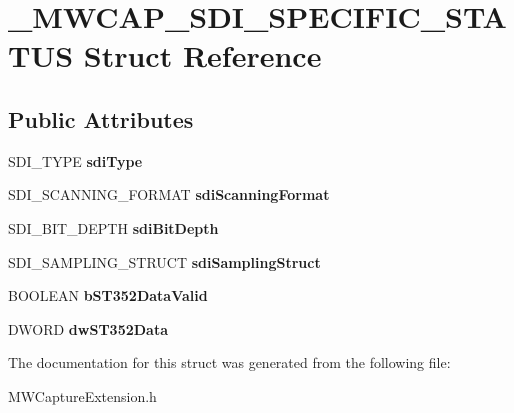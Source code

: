 \hypertarget{struct__MWCAP__SDI__SPECIFIC__STATUS}{\section{\-\_\-\-M\-W\-C\-A\-P\-\_\-\-S\-D\-I\-\_\-\-S\-P\-E\-C\-I\-F\-I\-C\-\_\-\-S\-T\-A\-T\-U\-S Struct Reference}
\label{struct__MWCAP__SDI__SPECIFIC__STATUS}
}
\subsection*{Public Attributes}
\begin{DoxyCompactItemize}
\item 
\hypertarget{struct__MWCAP__SDI__SPECIFIC__STATUS_a866c7aa6588af98e8a3ddc540ca386ba}{S\-D\-I\-\_\-\-T\-Y\-P\-E {\bfseries sdi\-Type}}\label{struct__MWCAP__SDI__SPECIFIC__STATUS_a866c7aa6588af98e8a3ddc540ca386ba}

\item 
\hypertarget{struct__MWCAP__SDI__SPECIFIC__STATUS_adaa94bff6695256b61974a0256c2c6a0}{S\-D\-I\-\_\-\-S\-C\-A\-N\-N\-I\-N\-G\-\_\-\-F\-O\-R\-M\-A\-T {\bfseries sdi\-Scanning\-Format}}\label{struct__MWCAP__SDI__SPECIFIC__STATUS_adaa94bff6695256b61974a0256c2c6a0}

\item 
\hypertarget{struct__MWCAP__SDI__SPECIFIC__STATUS_acacb670d2e92d43b3eaad731ad12f8b7}{S\-D\-I\-\_\-\-B\-I\-T\-\_\-\-D\-E\-P\-T\-H {\bfseries sdi\-Bit\-Depth}}\label{struct__MWCAP__SDI__SPECIFIC__STATUS_acacb670d2e92d43b3eaad731ad12f8b7}

\item 
\hypertarget{struct__MWCAP__SDI__SPECIFIC__STATUS_ab5119460d0494eeefdac34056975e0d7}{S\-D\-I\-\_\-\-S\-A\-M\-P\-L\-I\-N\-G\-\_\-\-S\-T\-R\-U\-C\-T {\bfseries sdi\-Sampling\-Struct}}\label{struct__MWCAP__SDI__SPECIFIC__STATUS_ab5119460d0494eeefdac34056975e0d7}

\item 
\hypertarget{struct__MWCAP__SDI__SPECIFIC__STATUS_a12121ad126f81d25611efefd4f7fdb52}{B\-O\-O\-L\-E\-A\-N {\bfseries b\-S\-T352\-Data\-Valid}}\label{struct__MWCAP__SDI__SPECIFIC__STATUS_a12121ad126f81d25611efefd4f7fdb52}

\item 
\hypertarget{struct__MWCAP__SDI__SPECIFIC__STATUS_a47f76ceb422515d60305f8eb37540779}{D\-W\-O\-R\-D {\bfseries dw\-S\-T352\-Data}}\label{struct__MWCAP__SDI__SPECIFIC__STATUS_a47f76ceb422515d60305f8eb37540779}

\end{DoxyCompactItemize}


The documentation for this struct was generated from the following file\-:\begin{DoxyCompactItemize}
\item 
M\-W\-Capture\-Extension.\-h\end{DoxyCompactItemize}

